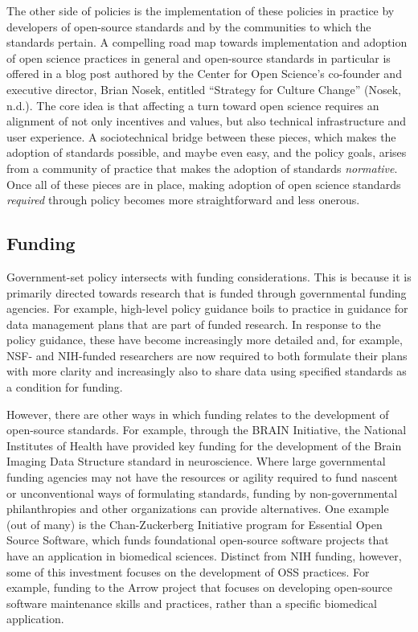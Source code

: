 \documentclass[
  letterpaper,
  DIV=11,
  numbers=noendperiod]{scrartcl}
\begin{document}
The other side of policies is the implementation of these policies in
practice by developers of open-source standards and by the communities
to which the standards pertain. A compelling road map towards
implementation and adoption of open science practices in general and
open-source standards in particular is offered in a blog post authored
by the Center for Open Science's co-founder and executive director,
Brian Nosek, entitled ``Strategy for Culture Change'' (Nosek, n.d.). The
core idea is that affecting a turn toward open science requires an
alignment of not only incentives and values, but also technical
infrastructure and user experience. A sociotechnical bridge between
these pieces, which makes the adoption of standards possible, and maybe
even easy, and the policy goals, arises from a community of practice
that makes the adoption of standards \emph{normative}. Once all of these
pieces are in place, making adoption of open science standards
\emph{required} through policy becomes more straightforward and less
onerous.

\subsection{Funding}\label{funding}

Government-set policy intersects with funding considerations. This is
because it is primarily directed towards research that is funded through
governmental funding agencies. For example, high-level policy guidance
boils to practice in guidance for data management plans that are part of
funded research. In response to the policy guidance, these have become
increasingly more detailed and, for example, NSF- and NIH-funded
researchers are now required to both formulate their plans with more
clarity and increasingly also to share data using specified standards as
a condition for funding.

However, there are other ways in which funding relates to the
development of open-source standards. For example, through the BRAIN
Initiative, the National Institutes of Health have provided key funding
for the development of the Brain Imaging Data Structure standard in
neuroscience. Where large governmental funding agencies may not have the
resources or agility required to fund nascent or unconventional ways of
formulating standards, funding by non-governmental philanthropies and
other organizations can provide alternatives. One example (out of many)
is the Chan-Zuckerberg Initiative program for Essential Open Source
Software, which funds foundational open-source software projects that
have an application in biomedical sciences. Distinct from NIH funding,
however, some of this investment focuses on the development of OSS
practices. For example, funding to the Arrow project that focuses on
developing open-source software maintenance skills and practices, rather
than a specific biomedical application.
\end{document}
